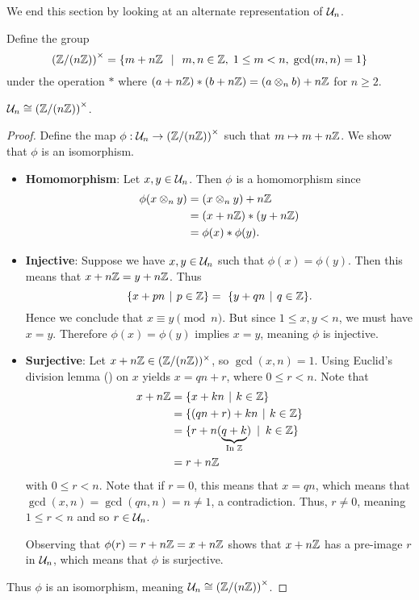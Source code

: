 We end this section by looking at an alternate representation of $\mathcal{U}_{n}$.
\begin{definition}
    Define the group
    \[
        \left(\Z/(n\Z)\right)^{\times} = \left\{m + n\Z \ \vert \ m,n \in \Z,\; 1 \leq m < n,\; \gcd(m, n)=1\right\}
    \]
    under the operation $\ast$ where $(a+n\mathbb{Z})\ast(b+n\mathbb{Z}) = (a\otimes_n b) + n\mathbb{Z}$ for $n \geq 2$.
\end{definition}
\begin{proposition}
    $\mathcal{U}_{n} \cong \left(\mathbb{Z}/(n\mathbb{Z})\right)^{\times}$.
\end{proposition}
\begin{proof}
    Define the map $\phi: \mathcal{U}_{n} \to \left(\mathbb{Z}/(n\mathbb{Z})\right)^{\times}$ such that $m \mapsto m + n\mathbb{Z}$. We show that $\phi$ is an isomorphism.

    \begin{itemize}
        \item \textbf{Homomorphism}: Let $x, y \in \mathcal{U}_{n}$. Then $\phi$ is a homomorphism since
        \begin{align*}
            \phi(x \otimes_n y) &= (x \otimes_n y) + n\mathbb{Z}\\
            &= (x + n\mathbb{Z}) \ast (y + n\mathbb{Z})\\
            &= \phi(x) \ast \phi(y).
        \end{align*}

        \item \textbf{Injective}: Suppose we have $x, y \in \mathcal{U}_{n}$ such that $\phi(x) = \phi(y)$. Then this means that $x + n\mathbb{Z} = y + n\mathbb{Z}$. Thus
        \[
            \{x + pn \vert p \in \Z \} = \ \{y + qn \vert q \in \Z \}.
        \]
        Hence we conclude that $x \equiv y \pmod{n}$. But since $1 \leq x, y < n$, we must have $x = y$. Therefore $\phi(x) = \phi(y)$ implies $x = y$, meaning $\phi$ is injective.

        \item \textbf{Surjective}: Let $x + n\mathbb{Z} \in (\mathbb{Z}/(n\mathbb{Z}))^\times$, so $\gcd(x,n) = 1$. Using Euclid's division lemma () on $x$ yields $x = qn + r$, where $0 \leq r < n$. Note that
        \begin{align*}
            x + n\Z &= \{x + kn \vert k \in \Z\}\\
            &= \{(qn + r) + kn \vert k \in \Z\}\\
            &= \{r + n(\underbrace{q+k}_{\text{In } \Z}) \vertalt k \in \Z\}\\
            &= r + n\Z
        \end{align*}
        with $0 \leq r < n$. Note that if $r = 0$, this means that $x = qn$, which means that $\gcd(x, n) = \gcd(qn, n) = n \neq 1$, a contradiction. Thus, $r \neq 0$, meaning $1 \leq r < n$ and so $r \in \mathcal{U}_{n}$.

        Observing that $\phi(r) = r + n\mathbb{Z} = x + n\mathbb{Z}$ shows that $x + n\mathbb{Z}$ has a pre-image $r$ in $\mathcal{U}_{n}$, which means that $\phi$ is surjective.
    \end{itemize}

    Thus $\phi$ is an isomorphism, meaning $\mathcal{U}_{n} \cong \left(\mathbb{Z}/(n\mathbb{Z})\right)^{\times}$.
\end{proof}

